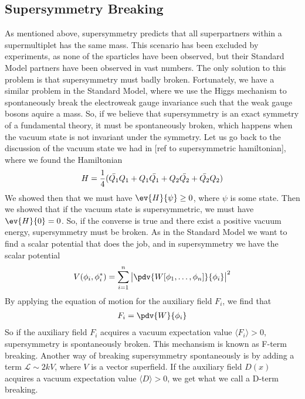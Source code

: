 \subsection{Supersymmetry Breaking}
As mentioned above, supersymmetry predicts that all superpartners within a supermultiplet has the same mass. This scenario has been excluded by experiments, as none of the sparticles have been observed, but their Standard Model partners have been observed in vast numbers. The only solution to this problem is that supersymmetry must badly broken. Fortunately, we have a similar problem in the Standard Model, where we use the Higgs mechanism to spontaneously break the electroweak gauge invariance such that the weak gauge bosons aquire a mass. So, if we believe that supersymmetry is an exact symmetry of a fundamental theory, it must be spontaneously broken, which happens when the vacuum state is not invariant under the symmetry. Let us go back to the discussion of the vacuum state we had in [ref to supersymmetric hamiltonian], where we found the Hamiltonian
\begin{align}
    H=\frac{1}{4}(\Bar{Q_{1}}Q_{1}+Q_{1}\Bar{Q_{1}}+Q_{2}\Bar{Q_{2}}+\Bar{Q_{2}}Q_{2})
\end{align}
We showed then that we must have $\ev{H}{\psi}\geq 0$, where $\psi$ is some state. Then we showed that if the vacuum state is supersymmetric, we must have $\ev{H}{0}=0$. So, if the converse is true and there exist a positive vacuum energy, supersymmetry must be broken. As in the Standard Model we want to find a scalar potential that does the job, and in supersymmetry we have the scalar potential
\begin{align}
    V(\phi_{i},\phi_{i}^{*})=\sum_{i=1}^{n}\big|\pdv{W[\phi_{1},\dots,\phi_{n}]}{\phi_{i}}\big|^{2}
\end{align}
By applying the equation of motion for the auxiliary field $F_{i}$, we find that
\begin{align}
    F_{i}=\pdv{W}{\phi_{i}}
\end{align}
So if the auxiliary field $F_{i}$ acquires a vacuum expectation value $\langle F_{i}\rangle>0$, supersymmetry is spontaneously broken. This mechansism is known as F-term breaking. Another way of breaking supersymmetry spontaneously is by adding a term $\mathcal{L}\sim 2kV$, where $V$ is a vector superfield. If the auxiliary field $D(x)$ acquires a vacuum expectation value $\langle D\rangle >0$, we get what we call a D-term breaking.

